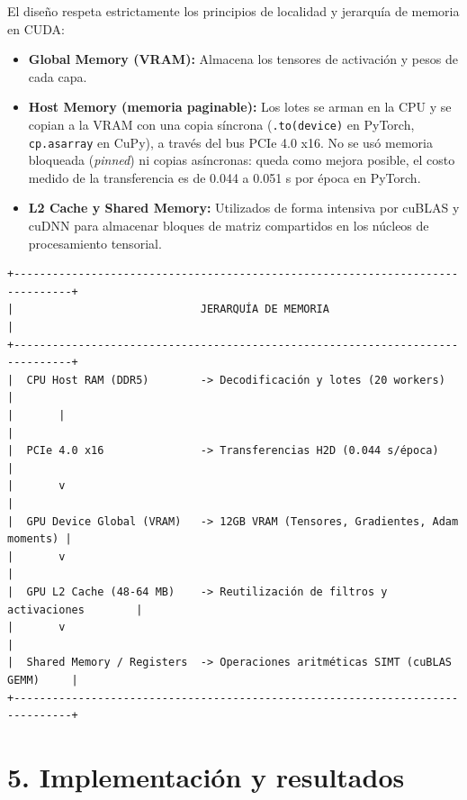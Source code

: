 \documentclass[
  11pt,
]{article}
\providecommand{\tightlist}{%
  \setlength{\itemsep}{0pt}\setlength{\parskip}{0pt}}
\begin{document}
El diseño respeta estrictamente los principios de localidad
y jerarquía de memoria en CUDA:

\begin{itemize}
\tightlist
\item
  \textbf{Global Memory (VRAM):} Almacena los tensores de
  activación y pesos de cada capa.
\item
  \textbf{Host Memory (memoria paginable):} Los lotes se
  arman en la CPU y se copian a la VRAM con una copia
  síncrona (\texttt{.to(device)} en PyTorch,
  \texttt{cp.asarray} en CuPy), a través del bus PCIe 4.0
  x16. No se usó memoria bloqueada (\emph{pinned}) ni copias
  asíncronas: queda como mejora posible, el costo medido de
  la transferencia es de 0.044 a 0.051 s por época en
  PyTorch.
\item
  \textbf{L2 Cache y Shared Memory:} Utilizados de forma
  intensiva por cuBLAS y cuDNN para almacenar bloques de
  matriz compartidos en los núcleos de procesamiento
  tensorial.
\end{itemize}

\begin{verbatim}
+-------------------------------------------------------------------------------+
|                             JERARQUÍA DE MEMORIA                              |
+-------------------------------------------------------------------------------+
|  CPU Host RAM (DDR5)        -> Decodificación y lotes (20 workers)            |
|       |                                                                       |
|  PCIe 4.0 x16               -> Transferencias H2D (0.044 s/época)             |
|       v                                                                       |
|  GPU Device Global (VRAM)   -> 12GB VRAM (Tensores, Gradientes, Adam moments) |
|       v                                                                       |
|  GPU L2 Cache (48-64 MB)    -> Reutilización de filtros y activaciones        |
|       v                                                                       |
|  Shared Memory / Registers  -> Operaciones aritméticas SIMT (cuBLAS GEMM)     |
+-------------------------------------------------------------------------------+
\end{verbatim}

\clearpage
\section{5. Implementación y resultados}\label{implementaciuxf3n-cuda-y-resultados-experimentales-paso-5}
\end{document}
